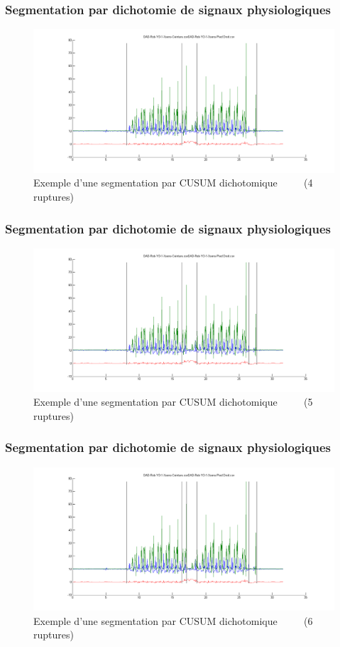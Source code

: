 \documentclass{beamer}
\begin{document}
\begin{frame}
	\frametitle{Segmentation par dichotomie de signaux physiologiques}
	\begin{figure}
		\includegraphics[width=\linewidth]{dikt-seg4.png}
		\caption{Exemple d'une segmentation par CUSUM dichotomique
		~~~~
		(4 ruptures)}
	\end{figure}
\end{frame}

\begin{frame}
	\frametitle{Segmentation par dichotomie de signaux physiologiques}
	\begin{figure}
		\includegraphics[width=\linewidth]{dikt-seg5.png}
		\caption{Exemple d'une segmentation par CUSUM dichotomique
		~~~~
		(5 ruptures)}
	\end{figure}
\end{frame}

\begin{frame}
	\frametitle{Segmentation par dichotomie de signaux physiologiques}
	\begin{figure}
		\includegraphics[width=\linewidth]{dikt-seg6.png}
		\caption{Exemple d'une segmentation par CUSUM dichotomique
		~~~~
		(6 ruptures)}
	\end{figure}
\end{frame}
\end{document}

